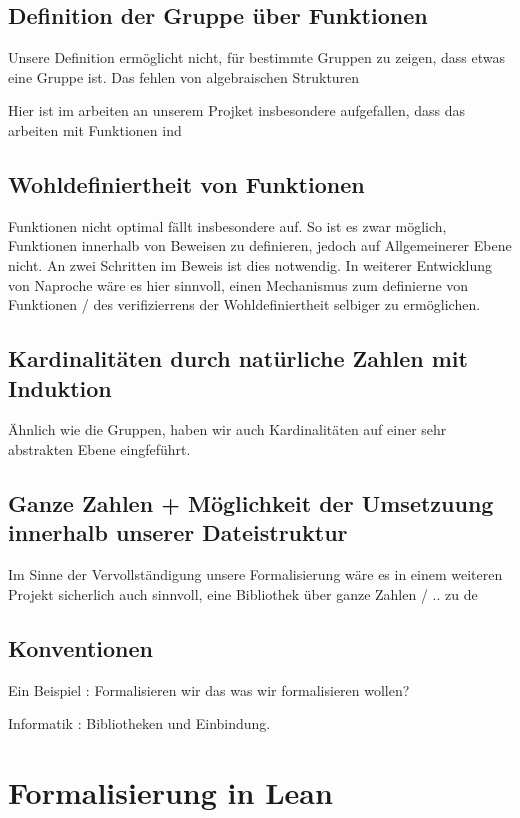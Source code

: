 \documentclass[a4paper,12pt]{scrartcl}
\begin{document}
\subsection{Definition der Gruppe über Funktionen}

Unsere Definition ermöglicht nicht, für bestimmte Gruppen zu zeigen, dass etwas eine Gruppe ist. Das fehlen von algebraischen Strukturen

Hier ist im arbeiten an unserem Projket insbesondere aufgefallen, dass das arbeiten mit Funktionen ind 

\subsection{Wohldefiniertheit von Funktionen}

Funktionen nicht optimal fällt insbesondere auf. So ist es zwar möglich, Funktionen innerhalb von Beweisen zu definieren, jedoch auf Allgemeinerer Ebene nicht. An zwei Schritten im Beweis ist dies notwendig. In weiterer Entwicklung von Naproche wäre es hier sinnvoll, einen Mechanismus zum definierne von Funktionen / des verifizierrens der Wohldefiniertheit selbiger zu ermöglichen.

\subsection{Kardinalitäten durch natürliche Zahlen mit Induktion}

Ähnlich wie die Gruppen, haben wir auch Kardinalitäten auf einer sehr abstrakten Ebene eingfeführt.

\subsection{Ganze Zahlen + Möglichkeit der Umsetzuung innerhalb unserer Dateistruktur}

Im Sinne der Vervollständigung unsere Formalisierung wäre es in einem weiteren Projekt sicherlich auch sinnvoll, eine Bibliothek über ganze Zahlen / .. zu de
 

\subsection{Konventionen}

Ein Beispiel : Formalisieren wir das was wir formalisieren wollen? 

Informatik : Bibliotheken und Einbindung.


\newpage
\section{Formalisierung in Lean}
\end{document}
